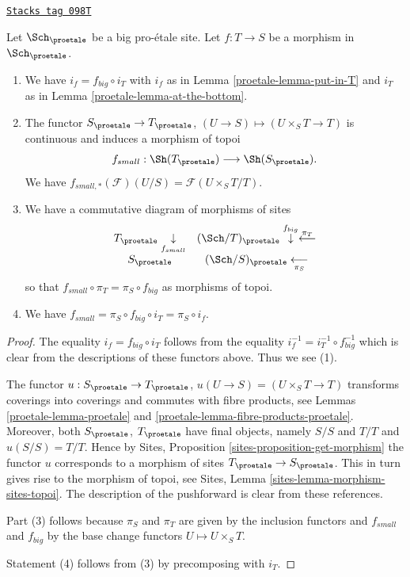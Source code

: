 \begin{lemma}
\label{proetale-lemma-morphism-big-small}
\href{https://stacks.math.columbia.edu/tag/098T}{\texttt{Stacks tag 098T}}

Let $\Sch_\proetale$ be a big pro-\'etale site.
Let $f : T \to S$ be a morphism in $\Sch_\proetale$.
\begin{enumerate}
\item We have $i_f = f_{big} \circ i_T$ with $i_f$ as in
Lemma \ref{proetale-lemma-put-in-T} and $i_T$ as in
Lemma \ref{proetale-lemma-at-the-bottom}.
\item The functor $S_\proetale \to T_\proetale$,
$(U \to S) \mapsto (U \times_S T \to T)$ is continuous and induces
a morphism of topoi
$$
f_{small} : \Sh(T_\proetale) \longrightarrow \Sh(S_\proetale).
$$
We have $f_{small, *}(\mathcal{F})(U/S) = \mathcal{F}(U \times_S T/T)$.
\item We have a commutative diagram of morphisms of sites
$$
\begin{array}{cc}T_\proetale \underset{f_{small}}{\downarrow} & (\Sch/T)_\proetale \overset{f_{big}}{\downarrow}\overset{\pi_T}{\longleftarrow} \\ S_\proetale & (\Sch/S)_\proetale \underset{\pi_S}{\longleftarrow}\end{array}
$$
so that $f_{small} \circ \pi_T = \pi_S \circ f_{big}$ as morphisms of topoi.
\item We have $f_{small} = \pi_S \circ f_{big} \circ i_T = \pi_S \circ i_f$.
\end{enumerate}
\end{lemma}

\begin{proof}

The equality $i_f = f_{big} \circ i_T$ follows from the
equality $i_f^{-1} = i_T^{-1} \circ f_{big}^{-1}$ which is
clear from the descriptions of these functors above.
Thus we see (1).

\medskip\noindent
The functor $u : S_\proetale \to T_\proetale$,
$u(U \to S) = (U \times_S T \to T)$
transforms coverings into coverings and commutes with fibre products,
see Lemmas \ref{proetale-lemma-proetale} and \ref{proetale-lemma-fibre-products-proetale}.
Moreover, both $S_\proetale$, $T_\proetale$ have final objects,
namely $S/S$ and $T/T$ and $u(S/S) = T/T$. Hence by
Sites, Proposition \ref{sites-proposition-get-morphism}
the functor $u$ corresponds to a morphism of sites
$T_\proetale \to S_\proetale$. This in turn gives rise to the
morphism of topoi, see
Sites, Lemma \ref{sites-lemma-morphism-sites-topoi}. The description
of the pushforward is clear from these references.

\medskip\noindent
Part (3) follows because $\pi_S$ and $\pi_T$ are given by the
inclusion functors and $f_{small}$ and $f_{big}$ by the
base change functors $U \mapsto U \times_S T$.

\medskip\noindent
Statement (4) follows from (3) by precomposing with $i_T$.
\end{proof}

